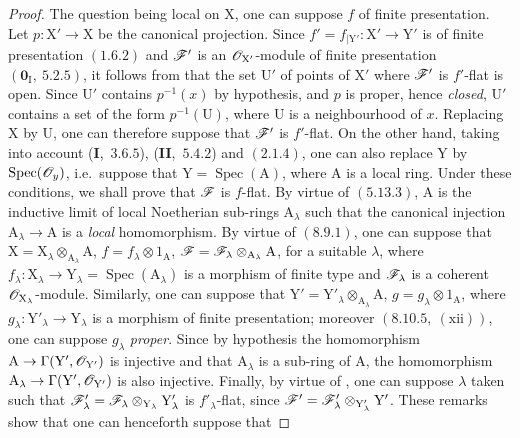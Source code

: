 \begin{proof}
The question being local on $\mathrm{X}$, one can suppose $f$ of finite presentation. Let
$p:\mathrm{X}'\to\mathrm{X}$ be the canonical projection. Since
$f'=f_{|\mathrm{Y}'}:\mathrm{X}'\to\mathrm{Y}'$ is of finite presentation
$(1.6.2)$ and $\mathscr{F}'$ is an $\mathscr{O}_{\mathrm{X}'}$-module of finite presentation $(\mathbf{0}_\mathrm{I},~5.2.5)$, it follows
from  that the set $\mathrm{U}'$ of points of $\mathrm{X}'$ where $\mathscr{F}'$ is $f'$-flat is open. Since $\mathrm{U}'$
contains $p^{-1}(x)$ by hypothesis, and $p$ is proper, hence \emph{closed}, $\mathrm{U}'$ contains a set of the form
$p^{-1}(\mathrm{U})$, where $\mathrm{U}$ is a neighbourhood of $x$. Replacing $\mathrm{X}$ by $\mathrm{U}$, one can therefore
suppose that $\mathscr{F}'$ is $f'$-flat. On the other hand, taking into account (\textbf{I},~$3.6.5$), (\textbf{II},~$5.4.2$)
and $(2.1.4)$, one can also replace $\mathrm{Y}$ by $\operatorname{Spec}(\mathscr{O}_y)$, i.e.\ suppose that $\mathrm{Y}=\operatorname{Spec}(\mathrm{A})$,
where $\mathrm{A}$ is a local ring. Under these conditions, we shall prove that $\mathscr{F}$ is $f$-flat. By virtue
of $(5.13.3)$, $\mathrm{A}$ is the inductive limit of local Noetherian sub-rings $\mathrm{A}_\lambda$ such that
the canonical injection $\mathrm{A}_\lambda\to\mathrm{A}$ is a \emph{local} homomorphism. By virtue of $(8.9.1)$, one
can suppose that $\mathrm{X}=\mathrm{X}_\lambda\otimes_{\mathrm{A}_\lambda}\mathrm{A}$, $f=f_\lambda\otimes 1_\mathrm{A}$, $\mathscr{F}=\mathscr{F}_\lambda\otimes_{\mathrm{A}_\lambda}\mathrm{A}$,
for a suitable $\lambda$, where $f_\lambda:\mathrm{X}_\lambda\to\mathrm{Y}_\lambda=\operatorname{Spec}(\mathrm{A}_\lambda)$ is a morphism of finite type and
$\mathscr{F}_\lambda$ is a coherent $\mathscr{O}_{\mathrm{X}_\lambda}$-module.
Similarly, one can suppose that $\mathrm{Y}'=\mathrm{Y}'_\lambda\otimes_{\mathrm{A}_\lambda}\mathrm{A}$, $g=g_\lambda\otimes 1_\mathrm{A}$, where $g_\lambda:\mathrm{Y}'_\lambda\to\mathrm{Y}_\lambda$ is a
morphism of finite presentation; moreover $(8.10.5,~(\text{xii}))$, one can suppose $g_\lambda$
\emph{proper}. Since by hypothesis the homomorphism $\mathrm{A}\to\Gamma(\mathrm{Y}',\mathscr{O}_{\mathrm{Y}'})$ is injective and that $\mathrm{A}_\lambda$
is a sub-ring of $\mathrm{A}$, the homomorphism $\mathrm{A}_\lambda\to\Gamma(\mathrm{Y}',\mathscr{O}_{\mathrm{Y}'})$ is also injective. Finally,
by virtue of , one can suppose $\lambda$ taken such that $\mathscr{F}'_\lambda=\mathscr{F}_\lambda\otimes_{\mathrm{Y}_\lambda}\mathrm{Y}'_\lambda$ is $f'_\lambda$-flat,
since $\mathscr{F}'=\mathscr{F}'_\lambda\otimes_{\mathrm{Y}'_\lambda}\mathrm{Y}'$. These remarks show that one can henceforth suppose that

\end{proof}
